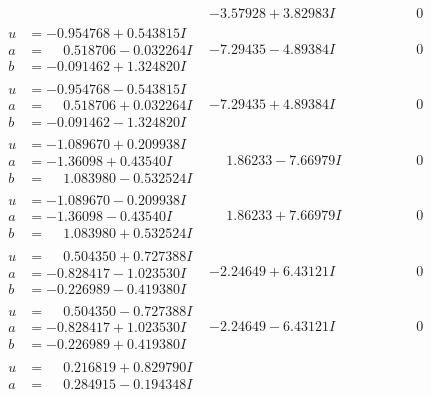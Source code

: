\documentclass[1p]{elsarticle_modified}
\theoremstyle{definition}
\begin{document}
$$\begin{array}{c|c|c}
 & -3.57928 + 3.82983 I & \phantom{-0.000000 } 0 \\ \hline\begin{aligned}
u &= -0.954768 + 0.543815 I \\
a &= \phantom{-}0.518706 - 0.032264 I \\
b &= -0.091462 + 1.324820 I\end{aligned}
 & -7.29435 - 4.89384 I & \phantom{-0.000000 } 0 \\ \hline\begin{aligned}
u &= -0.954768 - 0.543815 I \\
a &= \phantom{-}0.518706 + 0.032264 I \\
b &= -0.091462 - 1.324820 I\end{aligned}
 & -7.29435 + 4.89384 I & \phantom{-0.000000 } 0 \\ \hline\begin{aligned}
u &= -1.089670 + 0.209938 I \\
a &= -1.36098 + 0.43540 I \\
b &= \phantom{-}1.083980 - 0.532524 I\end{aligned}
 & \phantom{-}1.86233 - 7.66979 I & \phantom{-0.000000 } 0 \\ \hline\begin{aligned}
u &= -1.089670 - 0.209938 I \\
a &= -1.36098 - 0.43540 I \\
b &= \phantom{-}1.083980 + 0.532524 I\end{aligned}
 & \phantom{-}1.86233 + 7.66979 I & \phantom{-0.000000 } 0 \\ \hline\begin{aligned}
u &= \phantom{-}0.504350 + 0.727388 I \\
a &= -0.828417 - 1.023530 I \\
b &= -0.226989 - 0.419380 I\end{aligned}
 & -2.24649 + 6.43121 I & \phantom{-0.000000 } 0 \\ \hline\begin{aligned}
u &= \phantom{-}0.504350 - 0.727388 I \\
a &= -0.828417 + 1.023530 I \\
b &= -0.226989 + 0.419380 I\end{aligned}
 & -2.24649 - 6.43121 I & \phantom{-0.000000 } 0 \\ \hline\begin{aligned}
u &= \phantom{-}0.216819 + 0.829790 I \\
a &= \phantom{-}0.284915 - 0.194348 I \\

\end{aligned}
\end{array}$$
\end{document}
